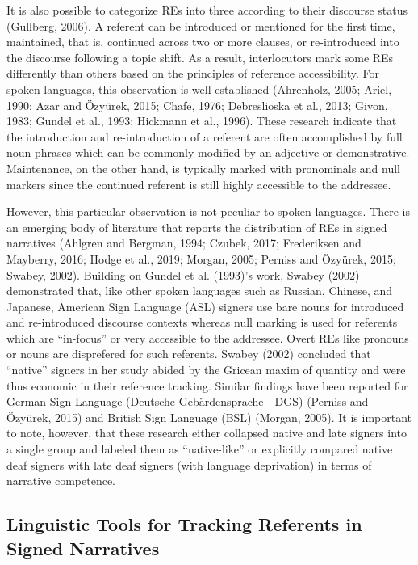 \documentclass[]{elsarticle} %
\begin{document}
It is also possible to categorize REs into three according to their
discourse status (Gullberg, 2006). A referent can be introduced or
mentioned for the first time, maintained, that is, continued across two
or more clauses, or re-introduced into the discourse following a topic
shift. As a result, interlocutors mark some REs differently than others
based on the principles of reference accessibility. For spoken
languages, this observation is well established (Ahrenholz, 2005; Ariel,
1990; Azar and Özyürek, 2015; Chafe, 1976; Debreslioska et al., 2013;
Givon, 1983; Gundel et al., 1993; Hickmann et al., 1996). These research
indicate that the introduction and re-introduction of a referent are
often accomplished by full noun phrases which can be commonly modified
by an adjective or demonstrative. Maintenance, on the other hand, is
typically marked with pronominals and null markers since the continued
referent is still highly accessible to the addressee.

However, this particular observation is not peculiar to spoken
languages. There is an emerging body of literature that reports the
distribution of REs in signed narratives (Ahlgren and Bergman, 1994;
Czubek, 2017; Frederiksen and Mayberry, 2016; Hodge et al., 2019;
Morgan, 2005; Perniss and Özyürek, 2015; Swabey, 2002). Building on
Gundel et al. (1993)'s work, Swabey (2002) demonstrated that, like other
spoken languages such as Russian, Chinese, and Japanese, American Sign
Language (ASL) signers use bare nouns for introduced and re-introduced
discourse contexts whereas null marking is used for referents which are
``in-focus'' or very accessible to the addressee. Overt REs like
pronouns or nouns are disprefered for such referents. Swabey (2002)
concluded that ``native'' signers in her study abided by the Gricean
maxim of quantity and were thus economic in their reference tracking.
Similar findings have been reported for German Sign Language (Deutsche
Gebärdensprache - DGS) (Perniss and Özyürek, 2015) and British Sign
Language (BSL) (Morgan, 2005). It is important to note, however, that
these research either collapsed native and late signers into a single
group and labeled them as ``native-like'' or explicitly compared native
deaf signers with late deaf signers (with language deprivation) in terms
of narrative competence.

\hypertarget{linguistic-tools-for-tracking-referents-in-signed-narratives}{%
\subsection{Linguistic Tools for Tracking Referents in Signed
Narratives}\label{linguistic-tools-for-tracking-referents-in-signed-narratives}}
\end{document}
